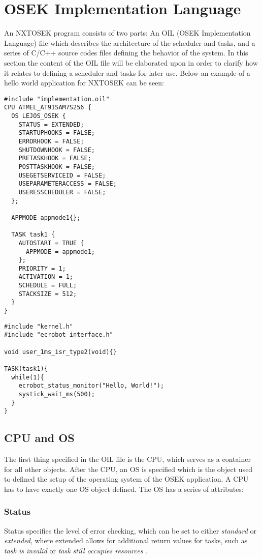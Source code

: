 
\section{OSEK Implementation Language}
An NXTOSEK program consists of two parts: An OIL (OSEK Implementation Language) file which describes the architecture of the scheduler and tasks, and a series of C/C++ source codes files defining the behavior of the system.
In this section the content of the OIL file will be elaborated upon in order to clarify how it relates to defining a scheduler and tasks for later use.
Below an example of a hello world application for NXTOSEK can be seen:
\begin{lstlisting}[caption=OIL]
#include "implementation.oil"
CPU ATMEL_AT91SAM7S256 {
  OS LEJOS_OSEK {
    STATUS = EXTENDED;
    STARTUPHOOKS = FALSE;
    ERRORHOOK = FALSE;
    SHUTDOWNHOOK = FALSE;
    PRETASKHOOK = FALSE;
    POSTTASKHOOK = FALSE;
    USEGETSERVICEID = FALSE;
    USEPARAMETERACCESS = FALSE;
    USERESSCHEDULER = FALSE;
  };
  
  APPMODE appmode1{};

  TASK task1 {
    AUTOSTART = TRUE {
      APPMODE = appmode1;    
    };
    PRIORITY = 1;
    ACTIVATION = 1;
    SCHEDULE = FULL;
    STACKSIZE = 512;
  }
}
\end{lstlisting}

\begin{lstlisting}[caption=C source]
#include "kernel.h"
#include "ecrobot_interface.h"

void user_1ms_isr_type2(void){}

TASK(task1){
  while(1){
    ecrobot_status_monitor("Hello, World!");
    systick_wait_ms(500);
  }
}
\end{lstlisting}

\subsection{CPU and OS}
The first thing specified in the OIL file is the CPU, which serves as a container for all other objects\cite{irisa25}.
After the CPU, an OS is specified which is the object used to defined the setup of the operating system of the OSEK application.
A CPU has to have exactly one OS object defined.
The OS has a series of attributes: 
\subsubsection*{Status}
Status specifies the level of error checking, which can be set to either \textit{standard} or \textit{extended}, where extended allows for additional return values for tasks, such as \textit{task is invalid} or \textit{task still occupies resources} \cite{irisa223}.\\

